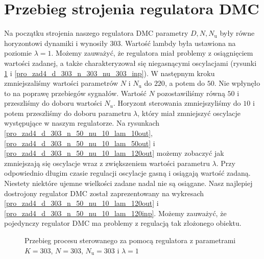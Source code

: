 \section{Przebieg strojenia regulatora DMC}
\label{pro4_DMC}
Na początku strojenia naszego regulatora DMC parametry $D, N, N_{\mathrm{u}}$ były równe horyzontowi dynamiki i wynosiły $303$. Wartość lambdy była ustawiona na poziomie $\lambda = 1$. Możemy zauważyć, że regulatora miał problemy z osiągnięciem wartości zadanej, a także charakteryzował się niegasnącymi oscylacjami (rysunki \ref{pro_zad4_d_303_n_303_nu_303_out} i \ref{pro_zad4_d_303_n_303_nu_303_inp}). W następnym kroku zmniejszaliśmy wartości parametrów $N$ i $N_{\mathrm{u}}$ do $220$, a potem do $50$. Nie wpłynęło to na poprawę przebiegów sygnałów. Wartość $N$ pozostawiliśmy równą $50$ i przeszliśmy do doboru wartości $N_{u}$. Horyzont sterowania zmniejszyliśmy do $10$ i potem przeszliśmy do doboru parametru $\lambda$, który miał zmniejszyć oscylacje występujące w naszym regulatorze. Na rysunkach \ref{pro_zad4_d_303_n_50_nu_10_lam_10out}, \ref{pro_zad4_d_303_n_50_nu_10_lam_50out} i \ref{pro_zad4_d_303_n_50_nu_10_lam_120out} możemy zobaczyć jak zmniejszają się oscylacje wraz z zwiększeniem wartości parametru $\lambda$. Przy odpowiednio długim czasie regulacji oscylacje gasną i osiągają wartość zadaną. Niestety niektóre ujemne wielkości zadane nadal nie są osiągane. Nasz najlepiej dostrojony regulator DMC został zaprezentowany na wykresach \ref{pro_zad4_d_303_n_50_nu_10_lam_120out} i \ref{pro_zad4_d_303_n_50_nu_10_lam_120inp}. Możemy zauważyć, że pojedynczy regulator DMC ma problemy z  regulacją tak złożonego obiektu. 

\begin{figure}[t]
    \centering
    \caption{Przebieg procesu sterowanego za pomocą regulatora z parametrami $K = \num{303}$, $N = \num{303}$, $N_{\mathrm{u}} = \num{303}$ i $\lambda = 1$}
    \label{pro_zad4_d_303_n_303_nu_303_out}
\end{figure}

